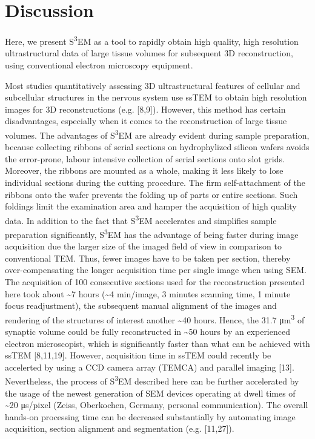\documentclass{article}
\begin{document}
\section*{Discussion}

Here, we present S\textsuperscript{3}EM as a tool to rapidly obtain high quality, high resolution ultrastructural data of large tissue volumes for subsequent 3D reconstruction, using conventional electron microscopy equipment.

Most studies quantitatively assessing 3D ultrastructural features of cellular and subcellular structures in the nervous system use ssTEM to obtain high resolution images for 3D reconstructions (e.g. [8,9]). However, this method has certain disadvantages, especially when it comes to the reconstruction of large tissue volumes. The advantages of S\textsuperscript{3}EM are already evident during sample preparation, because collecting ribbons of serial sections on hydrophylized silicon wafers avoids the error-prone, labour intensive collection of serial sections onto slot grids. Moreover, the ribbons are mounted as a whole, making it less likely to lose individual sections during the cutting procedure. The firm self-attachment of the ribbons onto the wafer prevents the folding up of parts or entire sections. Such foldings limit the examination area and hamper the acquisition of high quality data. In addition to the fact that S\textsuperscript{3}EM accelerates and simplifies sample preparation significantly, S\textsuperscript{3}EM has the advantage of being faster during image acquisition due the larger size of the imaged field of view in comparison to conventional TEM. Thus, fewer images have to be taken per section, thereby over-compensating the longer acquisition time per single image when using SEM. The acquisition of 100 consecutive sections used for the reconstruction presented here took about \textasciitilde{}7 hours (\textasciitilde{}4 min/image, 3 minutes scanning time, 1 minute focus readjustment), the subsequent manual alignment of the images and rendering of the structures of interest another \textasciitilde{}40 hours. Hence, the 31.7 μm\textsuperscript{3} of synaptic volume could be fully reconstructed in \textasciitilde{}50 hours by an experienced electron microscopist, which is significantly faster than what can be achieved with ssTEM [8,11,19]. However, acquisition time in ssTEM could recently be accelerted by using a CCD camera array (TEMCA) and parallel imaging [13]. Nevertheless, the process of S\textsuperscript{3}EM described here can be further accelerated by the usage of the newest generation of SEM devices operating at dwell times of \textasciitilde{}20 μs/pixel (Zeiss, Oberkochen, Germany, personal communication). The overall hands-on processing time can be decreased substantially by automating image acquisition, section alignment and segmentation (e.g. [11,27]).
\end{document}
